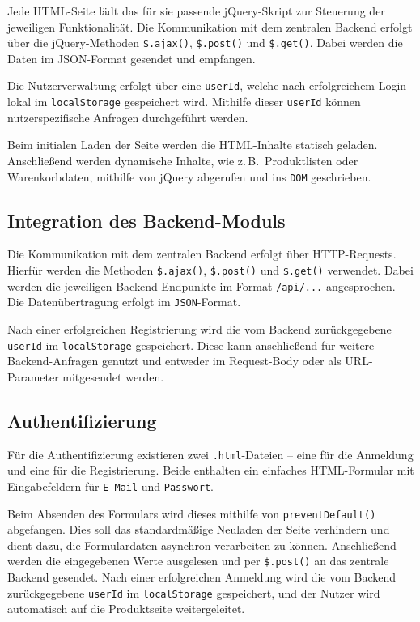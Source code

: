 \documentclass[oneside]{ausarbeitung}
\begin{document}
Jede HTML-Seite lädt das für sie passende jQuery-Skript zur Steuerung der jeweiligen Funktionalität. Die Kommunikation mit dem zentralen Backend erfolgt über die jQuery-Methoden \texttt{\$.\allowbreak ajax()}, \texttt{\$.\allowbreak post()} und \texttt{\$.\allowbreak get()}. Dabei werden die Daten im JSON-Format gesendet und empfangen.

Die Nutzerverwaltung erfolgt über eine \texttt{userId}, welche nach erfolgreichem Login lokal im \texttt{localStorage} gespeichert wird. Mithilfe dieser \texttt{userId} können nutzerspezifische Anfragen durchgeführt werden.

Beim initialen Laden der Seite werden die HTML-Inhalte statisch geladen. Anschließend werden dynamische Inhalte, wie z.\,B.\ Produktlisten oder Warenkorbdaten, mithilfe von jQuery abgerufen und ins \texttt{DOM} geschrieben.

\subsection{Integration des Backend-Moduls}

Die Kommunikation mit dem zentralen Backend erfolgt über HTTP-Requests. Hierfür werden die Methoden \verb|$.ajax()|, \verb|$.post()| und \verb|$.get()| verwendet. Dabei werden die jeweiligen Backend-Endpunkte im Format \texttt{/api/...} angesprochen. Die Datenübertragung erfolgt im \texttt{JSON}-Format.

Nach einer erfolgreichen Registrierung wird die vom Backend zurückgegebene \texttt{userId} im \texttt{localStorage} gespeichert. Diese kann anschließend für weitere Backend-Anfragen genutzt und entweder im Request-Body oder als URL-Parameter mitgesendet werden.

\subsection{Authentifizierung}

Für die Authentifizierung existieren zwei \texttt{.html}-Dateien – eine für die Anmeldung und eine für die Registrierung. Beide enthalten ein einfaches HTML-Formular mit Eingabefeldern für \texttt{E-Mail} und \texttt{Passwort}.

Beim Absenden des Formulars wird dieses mithilfe von \texttt{preventDefault()} abgefangen. Dies soll das standardmäßige Neuladen der Seite verhindern und dient dazu, die Formulardaten asynchron verarbeiten zu können. Anschließend werden die eingegebenen Werte ausgelesen und per \verb|$.post()| an das zentrale Backend gesendet. Nach einer erfolgreichen Anmeldung wird die vom Backend zurückgegebene \texttt{userId} im \texttt{localStorage} gespeichert, und der Nutzer wird automatisch auf die Produktseite weitergeleitet.
\end{document}
